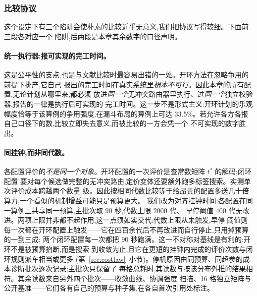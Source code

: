 \documentclass[manuscript,screen,review]{acmart}
\newcommand{\ContentionHi}{33.5\%}
\newcommand{\MatrixCells}{16}
\begin{document}
\begin{table}[t]
\caption{受控算例族。全部算例格共用 $12$ 工件、$36$ 道真实工序、$8$ 台机械臂、$H=0.3$、
$\bar{T}_t/\bar{T}_p\approx4.0$;三族分别只变化布局、车臂比与柔性。争用强度为初始随机种群
下让行时间占行驶总时间的比例,由算例自身结构决定而非人为设定。}
\label{tab:instances}
\small

\end{table}

\subsubsection{比较协议}
\label{sec:protocol}

这个设定下有三个陷阱会使朴素的比较近乎无意义,我们把协议写得较细。下面前三段各对应一个
陷阱,后两段是本章其余数字的口径声明。

\paragraph{统一执行器:报可实现的完工时间。}
这是公平性的支点,也是与文献比较时最容易出错的一处。开环方法在忽略争用的前提下排产,它自己
报出的完工时间在真实系统里\emph{根本不可行}。因此本章的所有配置,无论计划从哪里来,都必须
放进\emph{同一个}无冲突路由器里执行、过\emph{同一个}独立校验器,报告的一律是执行后可实现的
完工时间。这一步不是形式主义:开环计划的乐观幅度恰等于该算例的争用强度,在漏斗布局的算例上可达
\ContentionHi{}。若允许各方各报自己口径下的数,比较立即失去意义,而被比较的一方会凭一个
不可实现的数字胜出。

\paragraph{同挂钟,而非同代数。}
各配置评价的\emph{不是同一个对象}。开环配置的一次评价是查常数矩阵 $t^{*}$ 的解码;闭环配置
要对每个候选做完整的无冲突路由;定价变体还要额外跑多标签搜索。实测单次评价成本跨越两个数量
级。因此按相同代数比较等于给昂贵的配置多送几十倍算力,一个看似的机制增益可能只是预算更大。
我们改为对齐挂钟时间:各配置在同一算例上共享同一预算,主批次取 $90$ 秒,代数上限 $2000$ 代、
早停阈值 $400$ 代无改进。两项上限并非都不起作用,这一点须如实交代:代数上限从未触发,早停
阈值则每一次都在开环配置上触发——它在四百余代后不再改进而自行停止,只用掉预算的一到三成;
两个闭环配置每一次都把 $90$ 秒跑满。这一不对称对基线是有利的:开环不是被预算掐断,而是搜索
到收敛为止,且它在更短的挂钟内完成的评价次数与闭环规则派车相当或更多
(第~\ref{sec:costlaw}~小节)。停机原因由同预算、同超参的成本诊断批次逐次记录;主批次只保留了
每格总耗时,其读数与按该分布外推的结果相符。其余读数来自另外四个批次——收敛曲线、协调强度
扫描、\MatrixCells{} 格独立矩阵与公开基准——它们各有自己的预算与种子集,在各自首次引用处标注。
\end{document}
